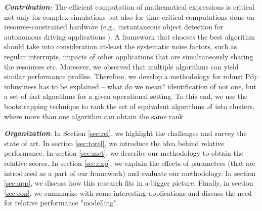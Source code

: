 \documentclass[conference]{IEEEtran}
\newcommand{\p}[1]{{\color{blue} Pdj: #1}}
\newcommand{\as}[1]{{\color{red} a: #1}}
\begin{document}
\textbf{\textit{Contribution:} }The efficient computation of mathematical expressions is critical not only for complex
simulations but also for time-critical computations done on resource-constrained hardware \cite{towardsEdgeComputing}
(e.g., instantaneous object detection for autonomous driving applications \cite{connectedvehicles}). A framework that
chooses the best algorithm should take into consideration at-least the systematic noise factors, such as  regular
interrupts, impacts of  other applications that are simultaneously sharing the resources etc. Moreover, we observed that
multiple algorithms can yield similar performance profiles. Therefore,  we develop a methodology for robust
\p{robustness has to be explained -- what do we mean?} identification of not one, but a set of  fast algorithms for a given operational setting. To this end, we use the bootstrapping technique\cite{bootstrap} to rank the set of equivalent algorithms $\mathcal{A}$ into clusters, where more than one algorithm can obtain the same rank.

\textit{\textbf{Organization}}: In Section \ref{sec:rel}, we highlight the challenges and survey the state of art. In section \ref{sec:torel},  we introduce the idea behind relative performance. In section \ref{sec:met}, we describe our methodology to obtain the relative scores. In section \ref{sec:exp}, we explain the effects of parameters (that are introduced as a part of our framework) and evaluate our methodology. In section \ref{sec:app}, we discuss how this research fits in a bigger picture. Finally, in section \ref{sec:con}, we  summarize with some interesting applications and discuss the need for relative performance "modelling". 
  

%
\end{document}
